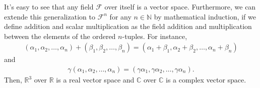 \documentclass[12pt]{article}
\newcommand{\N}{\mathbb{N}}
\newcommand{\R}{\mathbb{R}}
\begin{document}
It's easy to see that any field $\mathcal{F}$ over itself is a vector space. Furthermore, we can extende this generalization to $\mathcal{F}^{n}$ for any $n\in \N$ by mathematical induction, if we define addition and scalar multiplication as the field addition and multiplication between the elements of the ordered $n$-tuples. For instance,
\begin{align*}
  (\alpha_{1},\alpha_{2},\dots,\alpha_{n}) + (\beta_{1},\beta_{2},\dots,\beta_{n}) = (\alpha_{1}+\beta_{1},\alpha_{2}+\beta_{2},\dots,\alpha_{n}+\beta_{n})
\end{align*}
and 
\begin{align*}
  \gamma(\alpha_{1},\alpha_{2},\dots,\alpha_{n}) =  (\gamma\alpha_{1},\gamma\alpha_{2},\dots,\gamma\alpha_{n}).
\end{align*}
Then,  $\R^{3}$ over $\R$ is a real vector space and $\mathbb{C}$ over $\mathbb{C}$ is a complex vector space.
\end{document}
